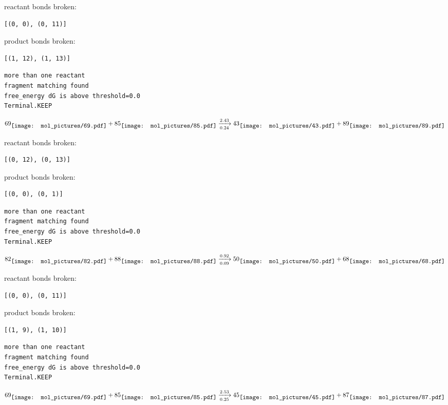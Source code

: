 \documentclass{article}
\begin{document}
reactant bonds broken:\begin{verbatim}
[(0, 0), (0, 11)]
\end{verbatim}
product bonds broken:\begin{verbatim}
[(1, 12), (1, 13)]
\end{verbatim}




\vspace{1cm}
\begin{verbatim}
more than one reactant
fragment matching found
free_energy dG is above threshold=0.0
Terminal.KEEP
\end{verbatim}
$$
69
\raisebox{-.5\height}{\texttt{[image: mol\_pictures/69.pdf]}}
+
85
\raisebox{-.5\height}{\texttt{[image: mol\_pictures/85.pdf]}}
\xrightarrow[0.24]{2.43}
43
\raisebox{-.5\height}{\texttt{[image: mol\_pictures/43.pdf]}}
+
89
\raisebox{-.5\height}{\texttt{[image: mol\_pictures/89.pdf]}}
$$


reactant bonds broken:\begin{verbatim}
[(0, 12), (0, 13)]
\end{verbatim}
product bonds broken:\begin{verbatim}
[(0, 0), (0, 1)]
\end{verbatim}




\vspace{1cm}
\begin{verbatim}
more than one reactant
fragment matching found
free_energy dG is above threshold=0.0
Terminal.KEEP
\end{verbatim}
$$
82
\raisebox{-.5\height}{\texttt{[image: mol\_pictures/82.pdf]}}
+
88
\raisebox{-.5\height}{\texttt{[image: mol\_pictures/88.pdf]}}
\xrightarrow[0.09]{0.92}
50
\raisebox{-.5\height}{\texttt{[image: mol\_pictures/50.pdf]}}
+
68
\raisebox{-.5\height}{\texttt{[image: mol\_pictures/68.pdf]}}
$$


reactant bonds broken:\begin{verbatim}
[(0, 0), (0, 11)]
\end{verbatim}
product bonds broken:\begin{verbatim}
[(1, 9), (1, 10)]
\end{verbatim}




\vspace{1cm}
\begin{verbatim}
more than one reactant
fragment matching found
free_energy dG is above threshold=0.0
Terminal.KEEP
\end{verbatim}
$$
69
\raisebox{-.5\height}{\texttt{[image: mol\_pictures/69.pdf]}}
+
85
\raisebox{-.5\height}{\texttt{[image: mol\_pictures/85.pdf]}}
\xrightarrow[0.25]{2.53}
45
\raisebox{-.5\height}{\texttt{[image: mol\_pictures/45.pdf]}}
+
87
\raisebox{-.5\height}{\texttt{[image: mol\_pictures/87.pdf]}}
$$
\end{document}
